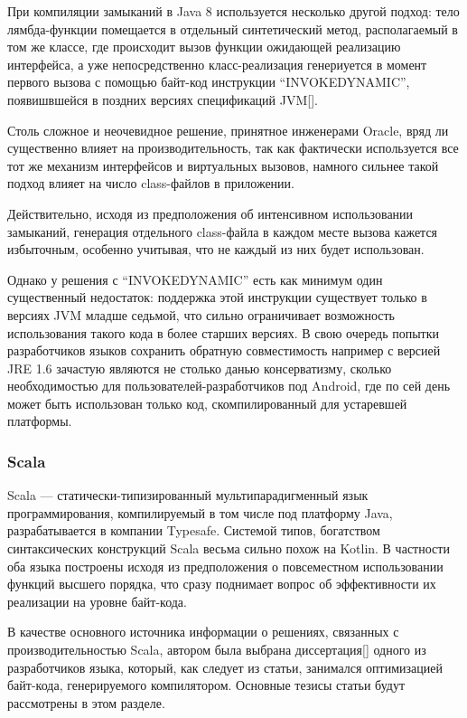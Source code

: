 При компиляции замыканий в Java 8 используется несколько другой подход: тело лямбда-функции
помещается в отдельный синтетический метод, располагаемый в том же классе, где происходит вызов
функции ожидающей реализацию интерфейса, а уже непосредственно класс-реализация генериуется
в момент первого вызова с помощью байт-код инструкции ``INVOKEDYNAMIC'', появишвшейся в поздних
версиях спецификаций JVM[]. %

Столь сложное и неочевидное решение, принятное инженерами Oracle, вряд ли существенно влияет на
производительность, так как фактически используется все тот же механизм интерфейсов и виртуальных
вызовов, намного сильнее такой подход влияет на число class-файлов в приложении.

Действительно, исходя из предположения об интенсивном использовании замыканий, генерация отдельного
class-файла в каждом месте вызова кажется избыточным, особенно учитывая, что не каждый из них
будет использован.

Однако у решения с ``INVOKEDYNAMIC'' есть как минимум один существенный недостаток: поддержка этой
инструкции существует только в версиях JVM младше седьмой, что сильно ограничивает возможность
использования такого кода в более старших версиях. В свою очередь попытки разработчиков языков
сохранить обратную совместимость например с версией JRE 1.6 зачастую являются не столько данью
консерватизму, сколько необходимостью для пользователей-разработчиков под Android, где по сей день
может быть использован только код, скомпилированный для устаревшей платформы.

\subsubsection{Scala}
Scala --- статически-типизированный мультипарадигменный язык программирования, компилируемый
в том числе под платформу Java, разрабатывается в компании Typesafe.
Системой типов, богатством синтаксических конструкций Scala весьма сильно похож на Kotlin.
В частности оба языка построены исходя из предположения о повсеместном использовании
функций высшего порядка, что сразу поднимает вопрос об эффективности их реализации на уровне
байт-кода.

В качестве основного источника информации о решениях, связанных с производительностью Scala,
автором была выбрана диссертация[] одного из разработчиков языка, который, как следует из статьи,
занимался оптимизацией байт-кода, генерируемого компилятором.
Основные тезисы статьи будут рассмотрены в этом разделе.

